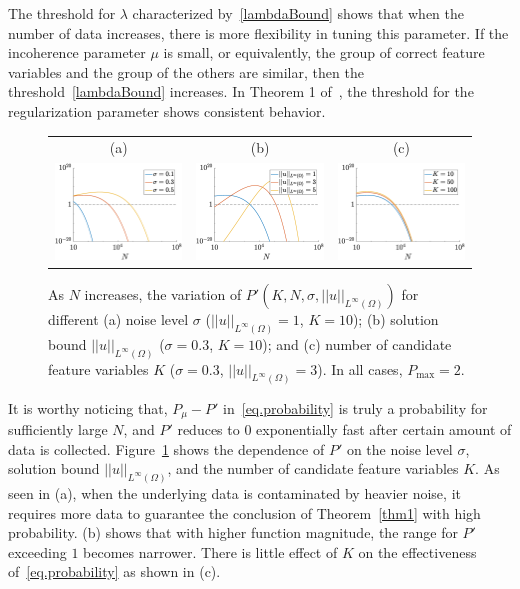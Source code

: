 \documentclass[a4paper,11pt]{article}
\begin{document}
The threshold for $\lambda$ characterized by~\eqref{lambdaBound} shows that when the number of data increases, there is more flexibility in tuning this parameter. If the incoherence parameter $\mu$ is small, or equivalently, the group of correct feature variables and the group of the others are similar, then the threshold~\eqref{lambdaBound} increases. In Theorem 1 of~\cite{wainwright2009sharp}, the threshold for the regularization parameter shows consistent behavior.
\begin{figure}
\centering
\begin{tabular}{ccc}
(a)&(b)&(c)\\
\includegraphics[width=2in]{Figures/prob1.eps}&	
\includegraphics[width=2in]{Figures/prob2.eps}&
\includegraphics[width=2in]{Figures/prob3.eps}
\end{tabular}
\caption{As $N$ increases, the variation of $P'(K,N,\sigma,||u||_{L^\infty(\Omega)})$ for different (a) noise level $\sigma$ ($||u||_{L^\infty(\Omega)}=1$, $K=10$); (b) solution bound $||u||_{L^\infty(\Omega)}$ ($\sigma=0.3$, $K=10$); and (c) number of candidate feature variables $K$ ($\sigma=0.3$, $||u||_{L^\infty(\Omega)}=3$). In all cases, $P_{\max}=2$.}\label{fig.probstudy}
\end{figure}

It is worthy noticing that, $P_\mu-P'$ in~\eqref{eq.probability} is truly a probability for sufficiently large $N$, and $P'$ reduces to $0$ exponentially fast after certain amount of data is collected. Figure~\ref{fig.probstudy} shows the dependence of $P'$ on the noise level $\sigma$, solution bound $||u||_{L^\infty(\Omega)}$, and the number of candidate feature variables $K$. As seen in (a), when the underlying data is contaminated by heavier noise, it requires more data to guarantee the conclusion of Theorem~\ref{thm1} with high probability. (b) shows that with higher function magnitude, the range for $P'$ exceeding $1$ becomes narrower. There is little effect of $K$ on the effectiveness of~\eqref{eq.probability} as shown in (c).
\end{document}
